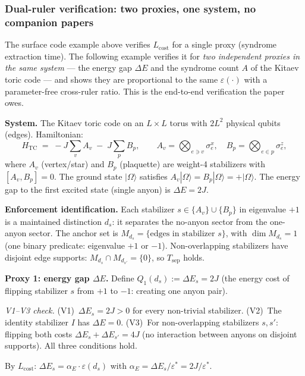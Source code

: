 \documentclass[11pt]{article}
\theoremstyle{remark}
\begin{document}
\subsubsection*{Dual-ruler verification: two proxies, one system, no companion papers}
\label{sec:dual_ruler}

The surface code example above verifies $L_{\mathrm{cost}}$ for a single proxy (syndrome extraction time).  The following example verifies it for \emph{two independent proxies in the same system} --- the energy gap $\Delta E$ and the syndrome count $A$ of the Kitaev toric code --- and shows they are proportional to the same $\varepsilon(\cdot)$ with a parameter-free cross-ruler ratio.  This is the end-to-end verification the paper owes.

\smallskip\noindent\textbf{System.}  The Kitaev toric code on an $L \times L$ torus with $2L^2$ physical qubits (edges).  Hamiltonian:
\[
H_{\mathrm{TC}} \;=\; -J\!\sum_v A_v \;-\; J\!\sum_p B_p, \qquad A_v = \bigotimes_{e \ni v} \sigma^x_e, \quad B_p = \bigotimes_{e \in p} \sigma^z_e,
\]
where $A_v$ (vertex/star) and $B_p$ (plaquette) are weight-4 stabilizers with $[A_v, B_p] = 0$.  The ground state $|\Omega\rangle$ satisfies $A_v|\Omega\rangle = B_p|\Omega\rangle = +|\Omega\rangle$.  The energy gap to the first excited state (single anyon) is $\Delta E = 2J$.

\smallskip\noindent\textbf{Enforcement identification.}  Each stabilizer $s \in \{A_v\} \cup \{B_p\}$ in eigenvalue $+1$ is a maintained distinction $d_s$: it separates the no-anyon sector from the one-anyon sector.  The anchor set is $M_{d_s} = \{\text{edges in stabilizer }s\}$, with $\dim M_{d_s} = 1$ (one binary predicate: eigenvalue $+1$ or $-1$).  Non-overlapping stabilizers have disjoint edge supports: $M_{d_s} \cap M_{d_{s'}} = \{0\}$, so $T_{\mathrm{sep}}$ holds.

\smallskip\noindent\textbf{Proxy 1: energy gap $\Delta E$.}  Define $Q_1(d_s) := \Delta E_s = 2J$ (the energy cost of flipping stabilizer $s$ from $+1$ to $-1$: creating one anyon pair).

\textit{V1--V3 check.}  (V1)~$\Delta E_s = 2J > 0$ for every non-trivial stabilizer.  (V2)~The identity stabilizer $I$ has $\Delta E = 0$.  (V3)~For non-overlapping stabilizers $s, s'$: flipping both costs $\Delta E_s + \Delta E_{s'} = 4J$ (no interaction between anyons on disjoint supports).  All three conditions hold.

By $L_{\mathrm{cost}}$: $\Delta E_s = \alpha_E \cdot \varepsilon(d_s)$ with $\alpha_E = \Delta E_s / \varepsilon^* = 2J/\varepsilon^*$.
\end{document}
